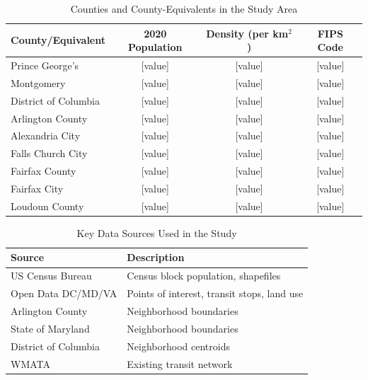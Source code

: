 \documentclass[manuscript,nonacm]{acmart}
\begin{document}
\begin{table}[h]
\caption{Counties and County-Equivalents in the Study Area}
\label{tab:counties}
\begin{tabular}{lccc}
\toprule
County/Equivalent & 2020 Population & Density (per km$^2$) & FIPS Code \\
\midrule
Prince George's & [value] & [value] & [value] \\
Montgomery & [value] & [value] & [value] \\
District of Columbia & [value] & [value] & [value] \\
Arlington County & [value] & [value] & [value] \\
Alexandria City & [value] & [value] & [value] \\
Falls Church City & [value] & [value] & [value] \\
Fairfax County & [value] & [value] & [value] \\
Fairfax City & [value] & [value] & [value] \\
Loudoun County & [value] & [value] & [value] \\
\bottomrule
\end{tabular}
\end{table}


\begin{table}[h]
\caption{Key Data Sources Used in the Study}
\label{tab:datasources}
\begin{tabular}{ll}
\toprule
Source & Description \\
\midrule
US Census Bureau & Census block population, shapefiles \\
Open Data DC/MD/VA & Points of interest, transit stops, land use \\
Arlington County & Neighborhood boundaries \\
State of Maryland & Neighborhood boundaries \\
District of Columbia & Neighborhood centroids \\
WMATA & Existing transit network \\
\bottomrule
\end{tabular}
\end{table}

\end{document}
